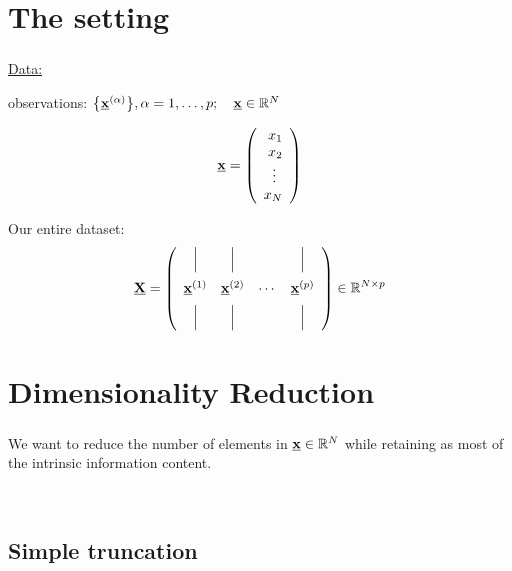 \section{The setting}

\begin{frame}\frametitle{\secname}
    
\underline{Data:}

observations: $\big\{ \underline{\mathbf{x}}^{(\alpha)} \big\}, \alpha = 1, \ldots, p; \quad \underline{\mathbf{x}} \in \mathbb{R}^N$

$$
\underline{\mathbf{x}} = \left( \begin{array}{rrrrrrrrrrrrrrrrrrrrrrrrrr} 
x_1\\
x_2\\
\vdots\;\,\\
x_N
\\ \end{array} \right)
$$

Our entire dataset:
\[
\underline{\mathbf{X}} = 
\left(
\begin{array}{cccc}
\Big| & \Big| & &\Big| \\[3mm]
\underline{\mathbf{x}}^{(1)} & \underline{\mathbf{x}}^{(2)} & \cdots &\underline{\mathbf{x}}^{(p)}\\[2mm]
\Big| & \Big| & &\Big|
\end{array}
\right) \in \mathbb{R}^{N \times p}
\]

\end{frame}

\section{Dimensionality Reduction}

\begin{frame}\frametitle{\secname}
We want to reduce the number of elements in $\underline{\mathbf{x}} \in \mathbb{R}^N$
while retaining as most of the intrinsic information content.

\\


\end{frame}

\subsection{Simple truncation}

